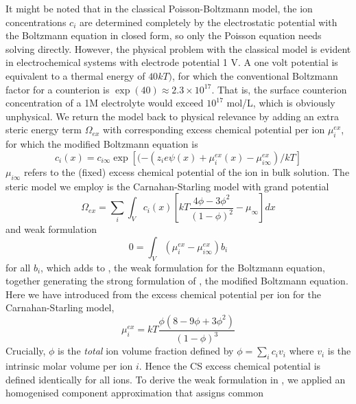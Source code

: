 It might be noted that in the classical Poisson-Boltzmann model, the
ion concentrations $c_i$ are determined completely by the
electrostatic potential with the Boltzmann equation in closed form, so
only the Poisson equation needs solving directly. However, the
physical problem with the classical model is evident in electrochemical
systems with electrode potential 1 V. A one volt potential is
equivalent to a thermal energy of $40 kT)$, for which the conventional
Boltzmann factor for a counterion is
$\exp(40)\approx 2.3 \times 10^{17}$.  That is, the surface counterion
concentration of a 1M electrolyte would exceed $10^{17}$ mol/L, which
is obviously unphysical.  We return the model back to physical
relevance by adding an extra steric energy term $\Omega_{ex}$ with
corresponding excess chemical potential per ion $\mu_{i}^{ex}$, for
which the modified Boltzmann equation is
\begin{equation}
    c_i(x)=c_{i\infty}\exp\left[(-(z_i e \psi(x) + \mu_i^{ex}(x)-\mu_{i\infty}^{ex})/kT\right]
    \label{general_Boltzmann}
\end{equation}
$\mu_{i\infty}$ refers to the (fixed) excess chemical potential of the ion in bulk solution.
The steric model we employ is the Carnahan-Starling model \cite{CarnahanStarling1969} with grand potential
\begin{equation}
    \Omega_{ex} = \sum_{i} \int_{V} c_{i}(x) \left[ kT
    \frac{4\phi - 3\phi^2}{(1-\phi)^2}
    -  \mu_{\infty}
    \right]dx
\end{equation}
and weak formulation
\begin{equation}
    0 = \int_{V} (\mu_i^{ex}-\mu_{i\infty}^{ex}) b_i
    \label{weak_CS}
\end{equation}
for all $b_i$, which adds to , the weak
formulation for the Boltzmann equation, together generating the strong
formulation of , the modified Boltzmann
equation.  Here we have introduced from the excess chemical potential
per ion for the Carnahan-Starling model,
\begin{equation}
    \mu_{i}^{ex} = kT \frac{\phi(8-9\phi+3\phi^2)}{(1-\phi)^3}
    \label{chem_pot_CS}
\end{equation}
Crucially, $\phi$ is the \emph{total} ion volume fraction defined by
$\phi=\sum_i c_i v_i$ where $v_i$ is the intrinsic molar volume per
ion $i$. Hence the CS excess chemical potential is defined identically
for all ions. To derive the weak formulation in , we
applied an homogenised component approximation that assigns common
